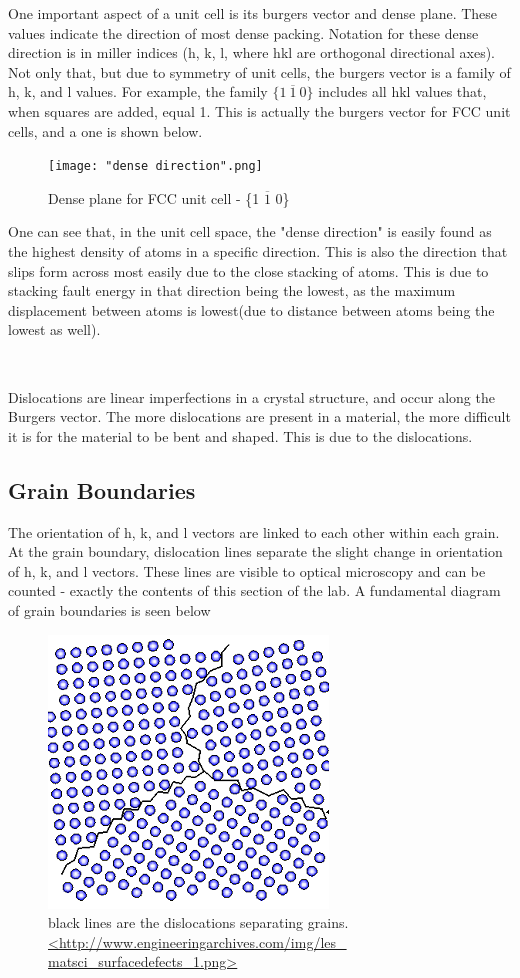 \documentclass{article}
\begin{document}
One important aspect of a unit cell is its burgers vector and dense plane. These values indicate the direction of most dense packing. Notation for these dense direction is in miller indices (h, k, l, where hkl are orthogonal directional axes). Not only that, but due to symmetry of unit cells, the burgers vector is a family of h, k, and l values. For example, the family $\{1\ \overline{1}\ 0\}$ includes all hkl values that, when squares are added, equal 1. This is actually the burgers vector for FCC unit cells, and a one is shown below.

\begin{figure}[h]
	\centering
	\texttt{[image: "dense direction".png]}
	\caption{Dense plane for FCC unit cell - \{1 $\overline{1}$ 0\}}
\end{figure}

One can see that, in the unit cell space, the "dense direction" is easily found as the highest density of atoms in a specific direction. This is also the direction that slips form across most easily due to the close stacking of atoms. This is due to stacking fault energy in that direction being the lowest, as the maximum displacement between atoms is lowest(due to distance between atoms being the lowest as well).

\ 

Dislocations are linear imperfections in a crystal structure, and occur along the Burgers vector. The more dislocations are present in a material, the more difficult it is for the material to be bent and shaped. This is due to the dislocations.

\subsection{Grain Boundaries} 

The orientation of h, k, and l vectors are linked to each other within each grain. At the grain boundary, dislocation lines separate the slight change in orientation of h, k, and l vectors. These lines are visible to optical microscopy and can be counted - exactly the contents of this section of the lab. A fundamental diagram of grain boundaries is seen below

\begin{figure}[h]
	\centering
	\includegraphics[scale=.6]{grain.png}
	\caption{black lines are the dislocations separating grains. \url{<http://www.engineeringarchives.com/img/les\_ matsci_surfacedefects_1.png>}}
\end{figure}
\ \\[1.35in]
\end{document}
